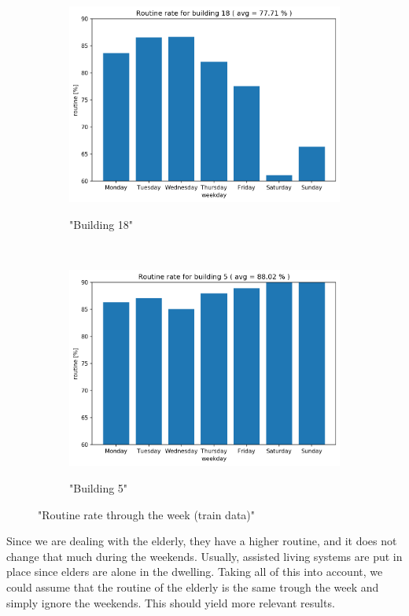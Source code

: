 \begin{figure}[H]
    \begin{subfigure}{.5\textwidth}
		\caption{"Building 18"}
		\includegraphics[width=1\linewidth]{../Figures/EC/b18week.png}
		\label{fig:ec_b18week}
	\end{subfigure}%
    ~ 
    \begin{subfigure}{.5\textwidth}
		\caption{"Building 5"}
		\includegraphics[width=1\linewidth]{../Figures/EC/b5weekd.png}
		\label{fig:ec_b5week}
	\end{subfigure}%
	\label{fig:ec_week}
	\caption{"Routine rate through the week (train data)"}
\end{figure}


Since we are dealing with the elderly, they have a higher routine, and it does not change that much during the weekends. 
Usually, assisted living systems are put in place since elders are alone in the dwelling.
Taking all of this into account, we could assume that the routine of the elderly is the same trough the week and simply ignore the weekends. 
This should yield more relevant results. 

